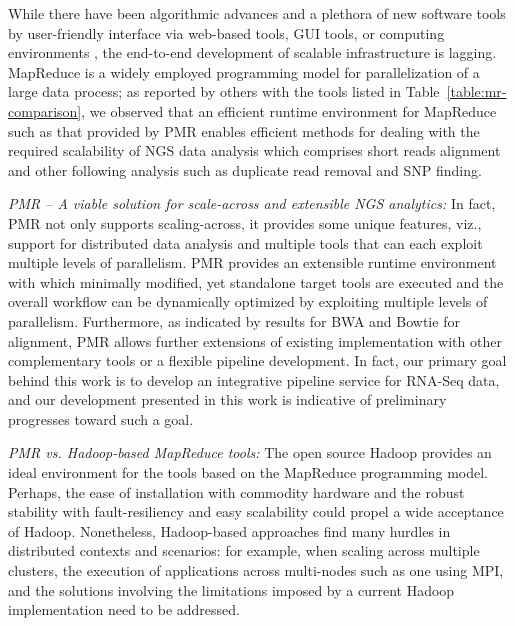 \documentclass{acm_proc_article-sp}
\begin{document}
While there have been algorithmic advances and a plethora of new
software tools by user-friendly interface via web-based tools, GUI
tools, or computing environments \cite{galaxy}, the end-to-end
development of scalable infrastructure is lagging.  MapReduce is a
widely employed programming model for parallelization of a large data
process; as reported by others with the tools listed in
Table~\ref{table:mr-comparison}, we observed that an efficient 
runtime environment for MapReduce such as that provided by PMR 
enables efficient methods for dealing with the required
scalability of NGS data analysis which comprises short reads alignment
and other following analysis such as duplicate read removal and SNP
finding.



\textit{PMR -- A viable solution for scale-across and extensible NGS
  analytics:} In fact, PMR not only supports scaling-across, it
provides some unique features, viz., support for distributed data
analysis and multiple tools that can each exploit multiple levels of
parallelism. %
PMR provides an extensible runtime environment with which minimally
modified, yet standalone target tools are executed and the overall
workflow can be dynamically optimized by exploiting multiple levels of
parallelism. Furthermore, as indicated by results for BWA and Bowtie
for alignment, PMR allows further extensions of existing
implementation with other complementary tools or a flexible pipeline
development.  In fact, our primary goal behind this work is to develop
an integrative pipeline service for RNA-Seq data, and our development
presented in this work is indicative of preliminary progresses toward
such a goal.

\textit{PMR vs. Hadoop-based MapReduce tools: }The open source Hadoop
provides an ideal environment for the tools based on the MapReduce
programming model.  Perhaps, the ease of installation with commodity
hardware and the robust stability with fault-resiliency and easy
scalability could propel a wide acceptance of Hadoop.  Nonetheless,
Hadoop-based approaches find many hurdles in distributed contexts and
scenarios: for example, when scaling across multiple
clusters\cite{weissman-mr-11}, the execution of applications across
multi-nodes such as one using MPI, and the solutions involving the
limitations imposed by a current Hadoop implementation need to be
addressed.
\end{document}

